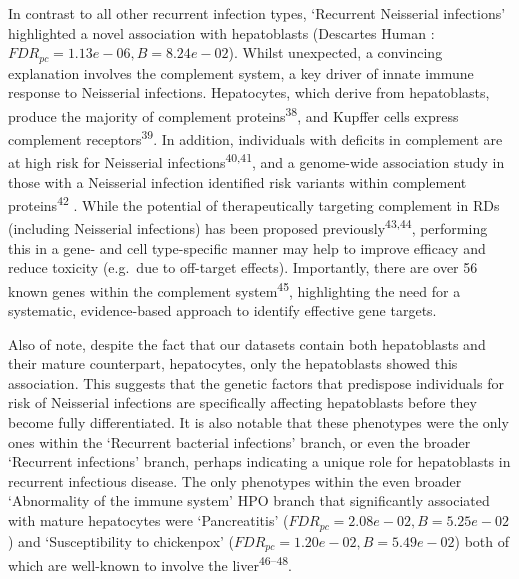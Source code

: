 \documentclass[
]{agujournal2019}
\begin{document}
In contrast to all other recurrent infection types, `Recurrent
Neisserial infections' highlighted a novel association with hepatoblasts
(Descartes Human : \(FDR_{pc}= 1.13e-06,B= 8.24e-02\)). Whilst
unexpected, a convincing explanation involves the complement system, a
key driver of innate immune response to Neisserial infections.
Hepatocytes, which derive from hepatoblasts, produce the majority of
complement proteins\textsuperscript{38}, and Kupffer cells express
complement receptors\textsuperscript{39}. In addition, individuals with
deficits in complement are at high risk for Neisserial
infections\textsuperscript{40,41}, and a genome-wide association study
in those with a Neisserial infection identified risk variants within
complement proteins\textsuperscript{42} . While the potential of
therapeutically targeting complement in RDs (including Neisserial
infections) has been proposed previously\textsuperscript{43,44},
performing this in a gene- and cell type-specific manner may help to
improve efficacy and reduce toxicity (e.g.~due to off-target effects).
Importantly, there are over 56 known genes within the complement
system\textsuperscript{45}, highlighting the need for a systematic,
evidence-based approach to identify effective gene targets.

Also of note, despite the fact that our datasets contain both
hepatoblasts and their mature counterpart, hepatocytes, only the
hepatoblasts showed this association. This suggests that the genetic
factors that predispose individuals for risk of Neisserial infections
are specifically affecting hepatoblasts before they become fully
differentiated. It is also notable that these phenotypes were the only
ones within the `Recurrent bacterial infections' branch, or even the
broader `Recurrent infections' branch, perhaps indicating a unique role
for hepatoblasts in recurrent infectious disease. The only phenotypes
within the even broader `Abnormality of the immune system' HPO branch
that significantly associated with mature hepatocytes were
`Pancreatitis' (\(FDR_{pc}= 2.08e-02,B= 5.25e-02\)) and `Susceptibility
to chickenpox' (\(FDR_{pc}= 1.20e-02,B= 5.49e-02\)) both of which are
well-known to involve the liver\textsuperscript{46--48}.
\end{document}
